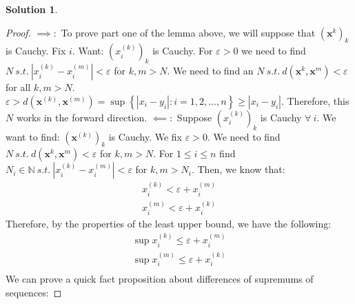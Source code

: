 \documentclass[12pt]{article}
\theoremstyle{definition} %
\newtheorem{solution}{Solution}
\theoremstyle{plain} %
\begin{document}
\begin{solution}
\begin{proof}
        \noindent
       $\implies :$  To prove part one of the lemma above, we will suppose that $(\textbf{x}^{k})_{k}$ is Cauchy. Fix $i$. Want: $(x_{i}^{(k)})_{k}$ is Cauchy. For $\varepsilon > 0$ we need to find $N\ s.t. \ \left\vert x_{i}^{(k)} - x_{i}^{(m)} \right\vert <\varepsilon $ for $k, m>N$. We need to find an $N\ s.t. \ d(\mathbf{x}^{k}, \mathbf{x}^{m})<\varepsilon$ for all $k,m>N$. $\varepsilon > d(\mathbf{x}^{(k)}, \mathbf{x}^{(m)})=\sup \left\{ \left\vert  x_{i}- y_{i}\right\vert : i= 1,2, \ldots , n   \right\} \geq \left\vert x_{i}-y_{i} \right\vert $. Therefore, this $N$ works in the forward direction.
        $\impliedby :$ Suppose $(x_{i}^{(k)})_{k}$ is Cauchy $\forall \ i$. We want to find: $(\mathbf{x}^{(k)})_{k}$ is Cauchy. We fix $\varepsilon >0$. We need to find $N\ s.t. \ d(\mathbf{x}^{k}, \mathbf{x}^{m})<\varepsilon $ for $k, m>N$. For $1\leq i\leq n$ find $N_{i} \in \mathbb{{N}} \ s.t. \ \left\vert x_{i}^{(k)}- x_{i}^{(m)} \right\vert < \varepsilon$ for $k,m>N_{i} $. Then, we know that:
        \begin{align}
            x_{i}^{(k)} <\varepsilon + x_{i}^{(m)} \\[10pt] 
            x_{i}^{(m)} < \varepsilon + x_{i}^{(k)} 
        \end{align}
        Therefore, by the properties of the least upper bound, we have the following:
        \begin{align}
          \sup x_{i}^{(k)} \leq \varepsilon + x_{i}^{(m)}\\[10pt] 
          \sup x_{i}^{(m)} \leq \varepsilon + x_{i}^{(k)}\\[10pt] 
        \end{align}
        We can prove a quick fact proposition about differences of supremums of sequences:


\end{proof}
\end{solution}
\end{document}
